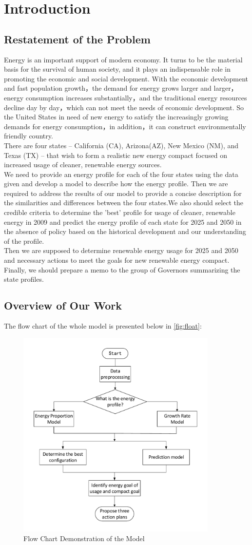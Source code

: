 \section{Introduction}
\subsection{Restatement of the Problem}
Energy is an important support of modern economy. It turns to be the material basis for the survival of human society, and it plays an indispensable role in promoting the economic and social development.\cite{energy} 
With the economic development and fast population growth，the demand for energy grows larger and larger，energy consumption increases substantially，and the traditional energy resources decline day by day，which can not meet the needs of economic development. So the United States in need of new energy to satisfy the increasingly growing demands for energy consumption，in addition，it can construct environmentally friendly country. \\
There are four states – California (CA), Arizona(AZ), New Mexico (NM), and Texas (TX) – that wish to form a realistic new energy compact focused on increased usage of cleaner, renewable energy sources. \\
We need to provide an energy profile for each of the four states using the data given and develop a model to describe how the energy profile. Then we are required to address the results of our model to provide a concise description for the similarities and differences between the four states.We also should select the credible criteria to determine the 'best' profile for usage of cleaner, renewable energy in 2009 and predict the energy profile of each state for 2025 and 2050 in the absence of policy based on the historical development and our understanding of the profile.\\
Then we are supposed to determine renewable energy usage for 2025 and 2050 and necessary actions to meet the goals for new renewable energy compact. Finally, we should prepare a memo to the group of Governors summarizing the state profiles.
\subsection{Overview of Our Work}
The flow chart of the whole model is presented below in \autoref{fig:float}:
\begin{figure}
	\centering
	\includegraphics[width=10cm]{figure/float}
	\caption{Flow Chart Demonstration of the Model}
	\label{fig:float}
\end{figure}
